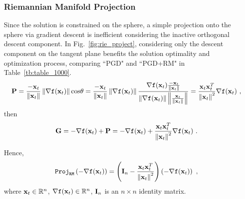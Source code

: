 \subsubsection{Riemannian Manifold Projection}
Since the solution is constrained on the sphere, a simple projection onto the sphere via gradient descent is inefficient considering the inactive orthogonal descent component.
In Fig.~\ref{fig:rie_project}, considering only the descent component on the tangent plane benefits the solution optimality and optimization process, comparing ``PGD" and ``PGD+RM" in Table~\ref{tb:table_1000}.
%
\begin{equation}
\begin{aligned}
\label{eq:P}
\mathbf{P} = \frac{-\mathbf{x}_t}{\left\lVert\mathbf{x}_t\right\rVert} \left\lVert\nabla \texttt{f}(\mathbf{x}_t)\right\rVert \text{cos}\theta
= \frac{-\mathbf{x}_t}{\left\lVert\mathbf{x}_t\right\rVert} \left\lVert\nabla \texttt{f}(\mathbf{x}_t)\right\rVert \frac{\nabla \texttt{f}(\mathbf{x}_t) \frac{-\mathbf{x}_t}{\left\lVert\mathbf{x}_t\right\rVert}}{\left\lVert\nabla \texttt{f}(\mathbf{x}_t)\right\rVert \left\Vert \frac{\mathbf{x}_t}{\left\lVert\mathbf{x}_t\right\rVert}\right\Vert}
= \frac{\mathbf{x}_t \mathbf{x}^T_t}{\left\lVert \mathbf{x}_t \right\rVert^2} \nabla \texttt{f}(\mathbf{x}_t)\ ,
\end{aligned}
\end{equation}
%
then
\begin{equation}
\begin{aligned}
\label{eq:G}
\mathbf{G}
= -\nabla \texttt{f}(\mathbf{x}_t) + \mathbf{P}
= -\nabla \texttt{f}(\mathbf{x}_t) + \frac{\mathbf{x}_t \mathbf{x}^T_t}{\left\lVert \mathbf{x}_t \right\rVert^2} \nabla \texttt{f}(\mathbf{x}_t)\ .
\end{aligned}
\end{equation}

Hence,
%
\begin{equation}
\begin{aligned}
\label{eq:rie_detail}
\texttt{Proj}_{\texttt{RM}}\left( -\nabla \texttt{f}(\mathbf{x}_t) \right)
= \left( \mathbf{I}_n - \frac{\mathbf{x}_t \mathbf{x}^T_t}{\left\lVert \mathbf{x}_t \right\rVert^2} \right) \left( -\nabla \texttt{f}(\mathbf{x}_t) \right)\ ,
\end{aligned}
\end{equation}
where $\mathbf{x}_t \in \mathbb{R}^n$, $\nabla \texttt{f}(\mathbf{x}_t) \in \mathbb{R}^n$, $\mathbf{I}_n$ is an $n \times n$ identity matrix.

